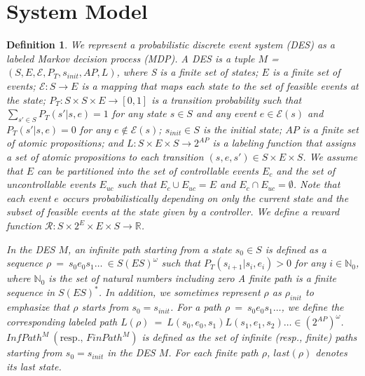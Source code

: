 \documentclass[letterpaper, 10 pt, conference]{ieeeconf}
\newtheorem{definition}{Definition}
\begin{document}
\section{System Model}

\begin{definition}
We represent a probabilistic discrete event system (DES) as a labeled Markov decision process (MDP). A DES is a tuple $M$ = $(S, E, \mathcal{E}, P_T, s_{init}, AP, L)$, where S is a finite set of states; $E$ is a finite set of events; $\mathcal{E} : S \rightarrow E$ is a mapping that maps each state to the set of feasible events at the state; $P_T:S \times S \times E \rightarrow [0,1]$ is a transition probability such that $\sum_{s' \in S} P_T(s'|s,e) = 1$ for any state $s \in S$ and any event $e \in \mathcal{E}(s) $ and $P_T(s'|s,e) = 0$ for any $e \notin \mathcal{E}(s)$; $s_{init} \in S$ is the initial state; $AP$ is a finite set of atomic propositions; and $L : S \times E \times S \rightarrow 2^{AP}$ is a labeling function that assigns a set of atomic propositions to each transition $(s, e, s') \in S \times E \times S$. We assume that $E$ can be partitioned into the set of controllable events $E_c$ and the set of uncontrollable events $E_{uc}$ such that $E_c \cup E_{uc} = E$ and $E_c \cap E_{uc} = \emptyset$. Note that each event $e$ occurs probabilistically depending on only the current state and the subset of feasible events at the state given by a controller. We define a reward function $\mathcal{R} : S \times 2^E \times E \times S \rightarrow \mathbb{R}$.

In the DES $M$, an infinite path starting from a state $s_0 \in S$ is defined as a sequence $\rho\ =\ s_0e_0s_1 \ldots\ \in S (E S)^{\omega}$ such that $P_T(s_{i+1}|s_i, e_i) > 0$ for any $ i \in \mathbb{N}_0$, where $\mathbb{N}_0$ is the set of natural numbers including zero A finite path is a finite sequence in $S (E S)^*$. In addition, we sometimes represent $\rho$ as $\rho_{init}$ to emphasize that $\rho$ starts from $s_0 = s_{init}$.
For a path $\rho\ =\ s_0e_0s_1 \ldots$, we define the corresponding labeled path $L(\rho)\ =\ L(s_0,e_0,s_1)L(s_1,e_1,s_2) \ldots \in (2^{AP})^{\omega}$.
 $InfPath^{M}\ ( \text{resp., }FinPath^{M})$ is defined as the set of infinite (resp., finite) paths starting from $s_0=s_{init}$ in the DES $M$. For each finite path $\rho$, $last(\rho)$ denotes its last state.
\end{definition}
\end{document}
